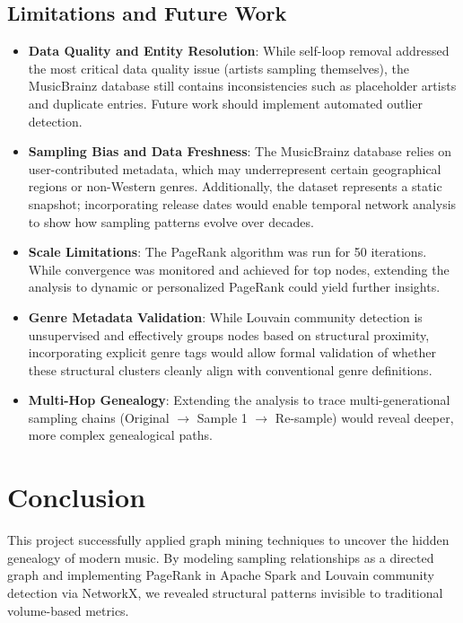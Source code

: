 \documentclass[a4paper, 12pt]{article}
\begin{document}
\subsection{Limitations and Future Work}
\begin{itemize}
    \item \textbf{Data Quality and Entity Resolution}: While self-loop removal addressed the most critical data quality issue (artists sampling themselves), the MusicBrainz database still contains inconsistencies such as placeholder artists and duplicate entries. Future work should implement automated outlier detection.
    
    \item \textbf{Sampling Bias and Data Freshness}: The MusicBrainz database relies on user-contributed metadata, which may underrepresent certain geographical regions or non-Western genres. Additionally, the dataset represents a static snapshot; incorporating release dates would enable temporal network analysis to show how sampling patterns evolve over decades.
    
    \item \textbf{Scale Limitations}: The PageRank algorithm was run for 50 iterations. While convergence was monitored and achieved for top nodes, extending the analysis to dynamic or personalized PageRank could yield further insights.
    
    \item \textbf{Genre Metadata Validation}: While Louvain community detection is unsupervised and effectively groups nodes based on structural proximity, incorporating explicit genre tags would allow formal validation of whether these structural clusters cleanly align with conventional genre definitions.
    
    \item \textbf{Multi-Hop Genealogy}: Extending the analysis to trace multi-generational sampling chains (Original $\to$ Sample 1 $\to$ Re-sample) would reveal deeper, more complex genealogical paths.
\end{itemize}

\clearpage

\section{Conclusion}
This project successfully applied graph mining techniques to uncover the hidden genealogy of modern music. By modeling sampling relationships as a directed graph and implementing PageRank in Apache Spark and Louvain community detection via NetworkX, we revealed structural patterns invisible to traditional volume-based metrics.
\end{document}
